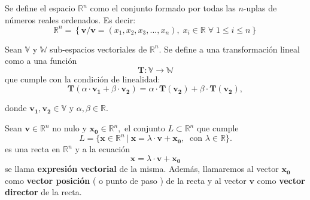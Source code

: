 \begin{definition} Se define el  espacio $\mathbb{R}^n$  como el conjunto formado por todas las $n$-uplas de n\'umeros reales ordenados.   Es decir:
    \begin{equation*}
        \mathbb{R}^n = \left\{ \boldsymbol{v} / \boldsymbol{v}=(x_1,x_2,x_3,...,x_n), \; x_i \in \mathbb{R} \;\forall \;   1\leq  i \leq n  \right\}
    \end{equation*}
\end{definition}






\begin{definition}  Sean  $\mathbb{V}$ y $\mathbb{W}$ sub-espacios vectoriales de $\mathbb{R}^n$.  Se  define a  una transformación lineal  como a  una función 
    \begin{equation*}
       \boldsymbol{T}: \mathbb{V} \rightarrow  \mathbb{W}
    \end{equation*}
    que cumple con la condición de linealidad:
    \begin{equation}\label{tl}
        \boldsymbol{T}(\alpha \cdot \boldsymbol{v_1} + \beta \cdot \boldsymbol{v_2})=\alpha \cdot \boldsymbol{T}(\boldsymbol{v_2}) + \beta \cdot \boldsymbol{T}(\boldsymbol{v_2}),
    \end{equation}
    
    donde $\boldsymbol{v_1},\boldsymbol{v_2} \in \mathbb{V}$ y $\alpha,\beta \in \mathbb{R}$. 
\end{definition}



\begin{definition} Sean    $\boldsymbol{v}\in\mathbb{R}^n$   no nulo y  $\boldsymbol{x_0}\in\mathbb{R}^n,$  el conjunto $L \subset \mathbb{R}^n $  que cumple  
 \begin{equation*}
      L = \{   \boldsymbol{x} \in\mathbb{R}^n  \:| \:    \boldsymbol{x}=  \lambda \cdot \boldsymbol{v} + \boldsymbol{x_0},  \:  \mbox{  con }  \lambda\in\mathbb{R} \}.
    \end{equation*}  es una recta en $ \mathbb{R}^n $  y a la ecuaci\'on $$ \boldsymbol{x}=  \lambda \cdot \boldsymbol{v} + \boldsymbol{x_0}$$  se  llama  \textbf{expresi\'on vectorial} de la misma.  Adem\'as, llamaremos al vector $\boldsymbol{x_0}$   como \textbf{vector posici\'on} ( o punto de paso )  de la recta   y al vector  $\boldsymbol{v}$ como \textbf{vector director} de la recta.
 \end{definition}


